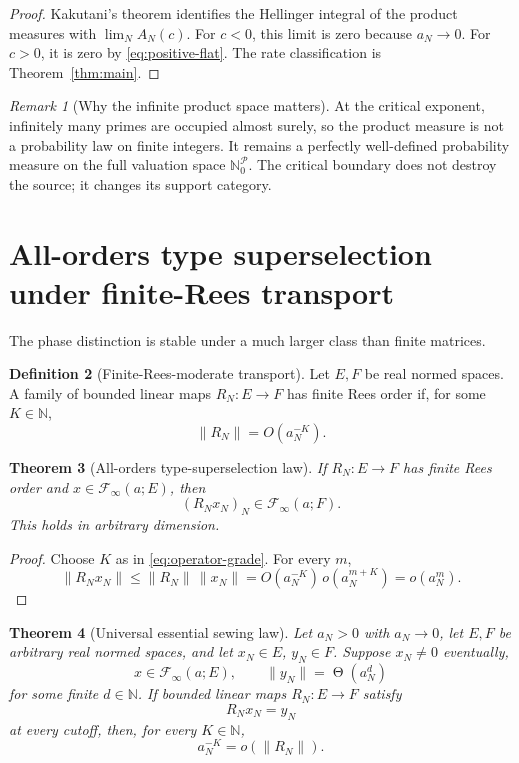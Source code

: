 \documentclass[11pt]{article}
\newtheorem{theorem}{Theorem}[section]
\theoremstyle{definition}
\newtheorem{definition}[theorem]{Definition}
\theoremstyle{remark}
\newtheorem{remark}[theorem]{Remark}
\newcommand{\N}{\mathbb N}
\newcommand{\cF}{\mathcal F}
\newcommand{\cP}{\mathcal P}
\newcommand{\Thetaas}{\mathop{\Theta}}
\begin{document}
\begin{proof}
Kakutani's theorem identifies the Hellinger integral of the product measures with
\(\lim_N A_N(c)\).  For \(c<0\), this limit is zero because \(a_N\to0\).  For \(c>0\),
it is zero by \eqref{eq:positive-flat}.  The rate classification is
Theorem~\ref{thm:main}.
\end{proof}

\begin{remark}[Why the infinite product space matters]\label{rem:infinite-product}
At the critical exponent, infinitely many primes are occupied almost surely, so the product
measure is not a probability law on finite integers.  It remains a perfectly well-defined
probability measure on the full valuation space \(\N_0^\cP\).  The critical boundary does not
destroy the source; it changes its support category.
\end{remark}

\section{All-orders type superselection under finite-Rees transport}\label{sec:no-sewing}

The phase distinction is stable under a much larger class than finite matrices.

\begin{definition}[Finite-Rees-moderate transport]\label{def:moderate}
Let \(E,F\) be real normed spaces.  A family of bounded linear maps
\(R_N:E\to F\) has finite Rees order if, for some \(K\in\N\),
\[
 \|R_N\|=O(a_N^{-K}).
 \tag{4.1}\label{eq:operator-grade}
\]
\end{definition}

\begin{theorem}[All-orders type-superselection law]\label{thm:flat-invariance}
If \(R_N:E\to F\) has finite Rees order and \(x\in\cF_\infty(a;E)\), then
\[
 (R_Nx_N)_N\in\cF_\infty(a;F).
 \tag{4.2}\label{eq:flat-invariance}
\]
This holds in arbitrary dimension.
\end{theorem}

\begin{proof}
Choose \(K\) as in \eqref{eq:operator-grade}.  For every \(m\),
\[
 \|R_Nx_N\|
 \leq\|R_N\|\,\|x_N\|
 =O(a_N^{-K})\,o(a_N^{m+K})
 =o(a_N^m).
\]
\end{proof}

\begin{theorem}[Universal essential sewing law]\label{thm:essential-sewing}
Let \(a_N>0\) with \(a_N\to0\), let \(E,F\) be arbitrary real normed spaces, and let
\(x_N\in E\), \(y_N\in F\).  Suppose \(x_N\neq0\) eventually,
\[
 x\in\cF_\infty(a;E),
 \qquad
 \|y_N\|=\Thetaas(a_N^d)
 \tag{4.3}\label{eq:abstract-types}
\]
for some finite \(d\in\N\).  If bounded linear maps \(R_N:E\to F\) satisfy
\[
 R_Nx_N=y_N
\]
at every cutoff, then, for every \(K\in\N\),
\[
 a_N^{-K}=o(\|R_N\|).
 \tag{4.4}\label{eq:essential-sewing}
\]
\end{theorem}
\end{document}
